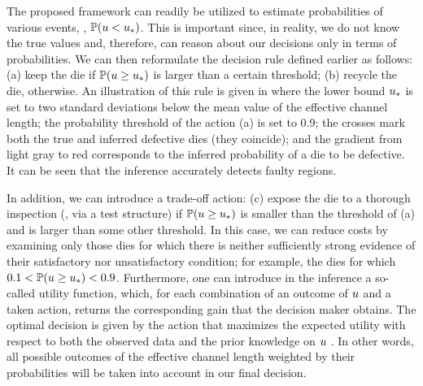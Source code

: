 The proposed framework can readily be utilized to estimate probabilities of various events, \eg, $\mathbb{P}(u < u_*)$. This is important since, in reality, we do not know the true values and, therefore, can reason about our decisions only in terms of probabilities. We can then reformulate the decision rule defined earlier as follows: (a) keep the die if $\mathbb{P}(u \geq u_*)$ is larger than a certain threshold; (b) recycle the die, otherwise.
An illustration of this rule is given in  where the lower bound $u_*$ is set to two standard deviations below the mean value of the effective channel length; the probability threshold of the action (a) is set to 0.9; the crosses mark both the true and inferred defective dies (they coincide); and the gradient from light gray to red corresponds to the inferred probability of a die to be defective. It can be seen that the inference accurately detects faulty regions.


In addition, we can introduce a trade-off action: (c) expose the die to a thorough inspection (\eg, via a test structure) if $\mathbb{P}(u \geq u_*)$ is smaller than the threshold of (a) and is larger than some other threshold. In this case, we can reduce costs by examining only those dies for which there is neither sufficiently strong evidence of their satisfactory nor unsatisfactory condition; for example, the dies for which $0.1 < \mathbb{P}(u \geq u_*) < 0.9$.
Furthermore, one can introduce in the inference a so-called utility function, which, for each combination of an outcome of $u$ and a taken action, returns the corresponding gain that the decision maker obtains.
The optimal decision is given by the action that maximizes the expected utility with respect to both the observed data and the prior knowledge on $u$ \cite{bernardo2007}. In other words, all possible outcomes of the effective channel length weighted by their probabilities will be taken into account in our final decision.

